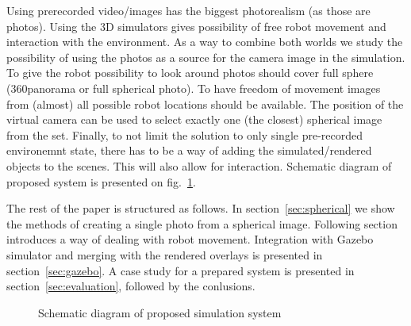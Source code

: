 \documentclass{svproc}
\begin{document}
Using prerecorded video/images has the biggest photorealism (as those are photos). Using the 3D simulators gives 
possibility of free robot movement and interaction with the environment. As a way to combine both worlds
we study the possibility of using the photos as a source for the camera image in the simulation. 
To give the robot possibility to look around photos should cover full sphere (360\textdegree panorama or 
full spherical photo). To have freedom of movement images from (almost) all possible robot locations should 
be available. The position of the virtual camera can be used to select exactly one (the closest) spherical image from the set.
Finally, to not limit the solution to only single pre-recorded environemnt state, there has to be
a way of adding the simulated/rendered objects to the scenes. This will also allow for interaction. Schematic
diagram of proposed system is presented on fig.~\ref{fig:flow}.

The rest of the paper is structured as follows. In section~\ref{sec:spherical} we show the methods of creating
a single photo from a spherical image. Following section introduces a way of dealing with robot movement.
Integration with Gazebo simulator and merging with the rendered overlays is presented in section~\ref{sec:gazebo}.
A case study for a prepared system is presented in section~\ref{sec:evaluation}, followed by the conlusions.

\begin{figure}[ht!]
\caption{Schematic diagram of proposed simulation system}
\label{fig:flow}
\end{figure}



\end{document}
